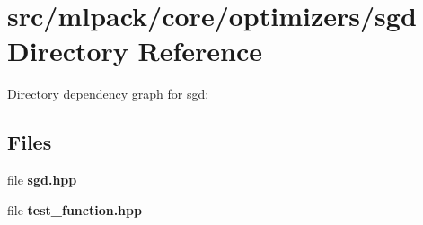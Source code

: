 \section{src/mlpack/core/optimizers/sgd Directory Reference}
\label{dir_3f6a0d4378e8db103132464bc6f2eb22}
Directory dependency graph for sgd\-:
\subsection*{Files}
\begin{DoxyCompactItemize}
\item 
file {\bf sgd.\-hpp}
\item 
file {\bf test\-\_\-function.\-hpp}
\end{DoxyCompactItemize}
